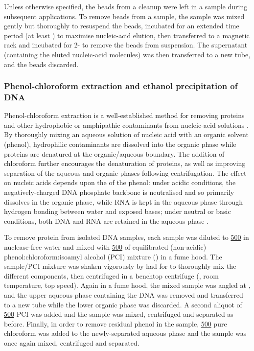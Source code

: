 Unless otherwise specified, the beads from a cleanup were left in a sample during subsequent applications. To remove beads from a sample, the sample was mixed gently but thoroughly to resuspend the beads, incubated for an extended time period (at least ) to maximise nucleic-acid elution, then transferred to a magnetic rack and incubated for 2- to remove the beads from suspension. The supernatant (containing the eluted nucleic-acid molecules) was then transferred to a new tube, and the beads discarded.

\subsubsection{Phenol-chloroform extraction and ethanol precipitation of DNA}
\label{sec:methods_molec_standard_phenol}

Phenol-chloroform extraction is a well-established method for removing proteins and other hydrophobic or amphipathic contaminants from nucleic-acid solutions \parencite{zumbo2012phenolchloroform}. By thoroughly mixing an aqueous solution of nucleic acid with an organic solvent (phenol), hydrophilic contaminants are dissolved into the organic phase while proteins are denatured at the organic/aqueous boundary. The addition of chloroform further encourages the denaturation of proteins, as well as improving separation of the aqueous and organic phases following centrifugation. The effect on nucleic acids depends upon the \ph{} of the phenol: under acidic conditions, the negatively-charged DNA phosphate backbone is neutralised and so primarily dissolves in the organic phase, while RNA is kept in the aqueous phase through hydrogen bonding between water and exposed bases; under neutral or basic conditions, both DNA and RNA are retained in the aqueous phase \parencite{zumbo2012phenolchloroform}.

To remove protein from isolated DNA samples, each sample was diluted to \ul{500} in nuclease-free water and mixed with \ul{500} of equilibrated (non-acidic) phenol:chloroform:isoamyl alcohol (PCI) mixture () in a fume hood. The sample/PCI mixture was shaken vigorously by had for  to thoroughly mix the different components, then centrifuged in a benchtop centrifuge (, room temperature, top speed). Again in a fume hood, the mixed sample was angled at , and the upper aqueous phase containing the DNA was removed and transferred to a new tube while the lower organic phase was discarded. A second aliquot of \ul{500} PCI was added and the sample was mixed, centrifuged and separated as before. Finally, in order to remove residual phenol in the sample, \ul{500} pure chloroform was added to the newly-separated aqueous phase and the sample was once again mixed, centrifuged and separated. 

